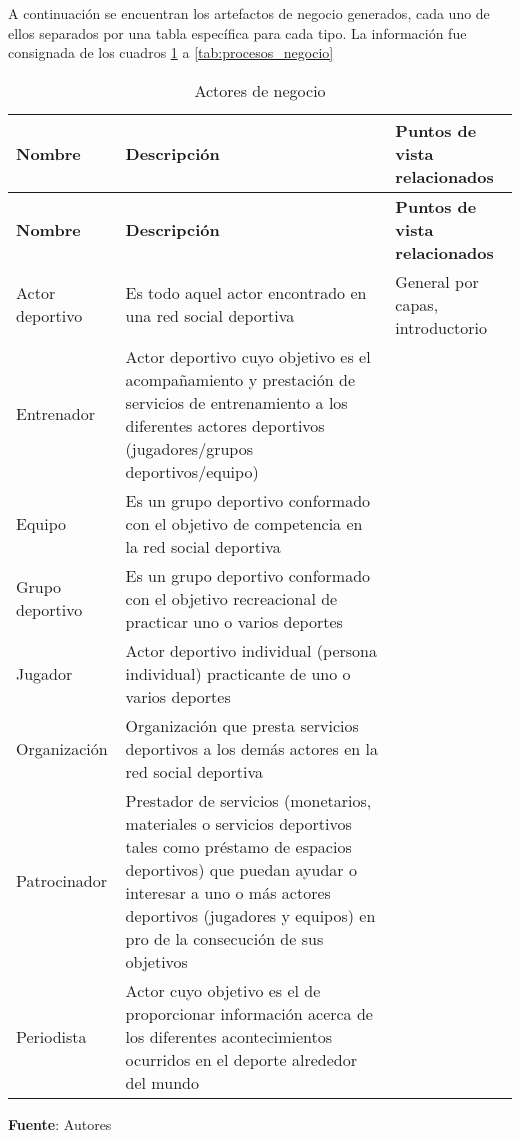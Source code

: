 A continuación se encuentran los artefactos de negocio generados, cada uno de ellos separados por una tabla específica para cada tipo. La información fue consignada de los cuadros \ref{tab:actores_negocio} a \ref{tab:procesos_negocio}

\begin{center}
	\begin{longtable}{|p{4cm}|p{7cm}|p{4cm}|}
		\caption{Actores de negocio \label{tab:actores_negocio}} \\
		\hline
		\textbf{Nombre} &
		\textbf{Descripción} &
		\textbf{Puntos de vista relacionados} \\
		\hline
		\endfirsthead
		\hline
		\textbf{Nombre} &
		\textbf{Descripción} &
		\textbf{Puntos de vista relacionados} \\
		\hline
		\endhead
		\hline
		\endfoot
		\hline
		\endlastfoot
		Actor deportivo &
		Es todo aquel actor encontrado en una red social deportiva &
		General por capas, introductorio \\
		\hline
		Entrenador &
		Actor deportivo cuyo objetivo es el acompañamiento y prestación de servicios de entrenamiento a los diferentes actores deportivos (jugadores/grupos deportivos/equipo) &
		\\
		\hline
		Equipo &
		Es un grupo deportivo conformado con el objetivo de competencia en la red social deportiva &
		\\
		\hline
		Grupo deportivo &
		Es un grupo deportivo conformado con el objetivo recreacional de practicar uno o varios deportes &
		\\
		\hline
		Jugador &
		Actor deportivo individual (persona individual) practicante de uno o varios deportes &
		\\
		\hline
		Organización &
		Organización que presta servicios deportivos a los demás actores en la red social deportiva &
		\\
		\hline
		Patrocinador &
		Prestador de servicios (monetarios, materiales o servicios deportivos tales como préstamo de espacios deportivos) que puedan ayudar o interesar a uno o más actores deportivos (jugadores y equipos) en pro de la consecución de sus objetivos &
		\\
		\hline
		Periodista &
		Actor cuyo objetivo es el de proporcionar información acerca de los diferentes acontecimientos ocurridos en el deporte alrededor del mundo &
		\\
		\hline
		\end{longtable}
	\textbf{Fuente}: Autores
\end{center}

